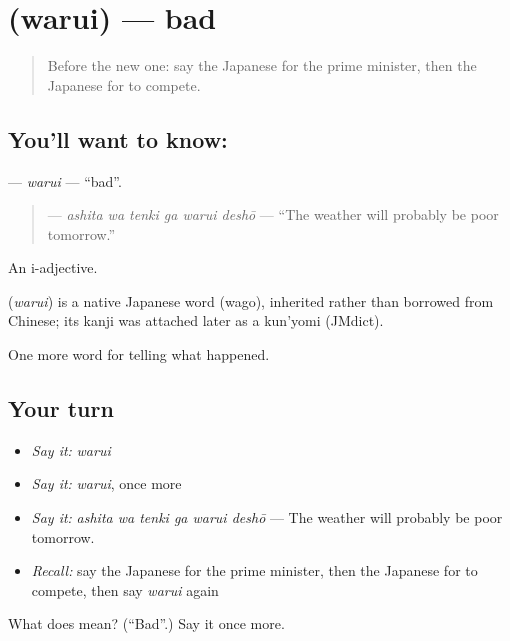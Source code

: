 \section[\texorpdfstring{\ja{わるい} (warui)}{わるい (warui)}]{ (warui) — bad}

\label{lesson:JA-C284-warui}



\begin{quote}
Before the new one: say the Japanese for the prime minister, then the Japanese for to compete.
\end{quote}

\subsection*{You'll want to know: }
\textbf{} — \emph{warui} — \textquotedblleft{}bad\textquotedblright{}.

\begin{quote}
\textbf{  } — \emph{ashita wa tenki ga warui deshō} — \textquotedblleft{}The weather will probably be poor tomorrow.\textquotedblright{}
\end{quote}

An i-adjective.

\begin{cousinweb}
\textbf{} (\emph{warui}) is a native Japanese word (wago), inherited rather than borrowed from Chinese; its kanji was attached later as a kun'yomi (JMdict).
\end{cousinweb}

\begin{grammarlens}[title={What you've built}]
One more word for telling what happened.
\end{grammarlens}

\subsection*{Your turn}
\begin{itemize}
\raggedright
  \item \emph{Say it:} \emph{warui}
  \item \emph{Say it:} \emph{warui}, once more
  \item \emph{Say it:} \emph{ashita wa tenki ga warui deshō} — The weather will probably be poor tomorrow.
  \item \emph{Recall:} say the Japanese for the prime minister, then the Japanese for to compete, then say \emph{warui} again
\end{itemize}

\begin{tcolorbox}[breakable,colback=teal!4,colframe=teal!35!black,title={Before you move on}]
What does  mean? (\textquotedblleft{}Bad\textquotedblright{}.) Say it once more.
\end{tcolorbox}
